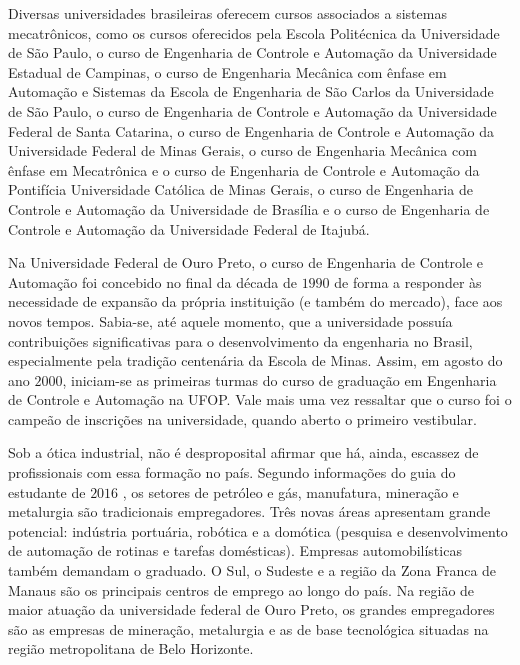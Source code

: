 Diversas universidades brasileiras oferecem cursos associados a sistemas mecatr{\^o}nicos, como os cursos oferecidos pela Escola Polit{\'e}cnica da Universidade de S{\~a}o Paulo, o curso de Engenharia de Controle e Automa{\c c}{\~a}o da Universidade Estadual de Campinas, o curso de Engenharia Mec{\^a}nica com {\^e}nfase em Automa{\c c}{\~a}o e Sistemas da Escola de Engenharia de S{\~a}o Carlos da Universidade de S{\~a}o Paulo, o curso de Engenharia de Controle e Automa{\c c}{\~a}o da Universidade Federal de Santa Catarina, o curso de Engenharia de Controle e Automa{\c c}{\~a}o da Universidade Federal de Minas Gerais, o curso de Engenharia Mec{\^a}nica com {\^e}nfase em Mecatr{\^o}nica e o curso de Engenharia de Controle e Automa{\c c}{\~a}o da Pontif{\'i}cia Universidade Católica de Minas Gerais, o curso de Engenharia de Controle e Automa{\c c}{\~a}o da Universidade de Bras{\'i}lia e o curso de Engenharia de Controle e Automa{\c c}{\~a}o da Universidade Federal de Itajub{\'a}.

Na Universidade Federal de Ouro Preto, o curso de Engenharia de Controle e Automa{\c c}{\~a}o foi concebido no final da d{\'e}cada de $1990$ de forma a responder às necessidade de expans{\~a}o da pr{\'o}pria institui{\c c}{\~a}o (e tamb{\'e}m do mercado), face aos novos tempos. Sabia-se, at{\'e} aquele momento, que a universidade possu{\'i}a contribui{\c c}{\~o}es significativas para o desenvolvimento da engenharia no Brasil, especialmente pela tradi{\c c}{\~a}o centen{\'a}ria da Escola de Minas. Assim, em agosto do ano $2000$, iniciam-se as primeiras turmas do curso de gradua{\c c}{\~a}o em Engenharia de Controle e Automa{\c c}{\~a}o na UFOP. Vale mais uma vez ressaltar que o curso foi o campeão de inscrições na universidade, quando aberto o primeiro vestibular.

Sob a ótica industrial, não é desproposital afirmar que há, ainda, escassez de profissionais com essa formação no país. Segundo informações do guia do estudante de $2016$ \cite{guia-do-estudante}, os setores de petróleo e gás, manufatura, mineração e metalurgia são tradicionais empregadores. Três novas áreas apresentam grande potencial: indústria portuária, robótica e a domótica (pesquisa e desenvolvimento de automação de rotinas e tarefas domésticas). Empresas automobilísticas também demandam o graduado. O Sul, o Sudeste e a região da Zona Franca de Manaus são os principais centros de emprego ao longo do país. Na região de maior atuação da universidade federal de Ouro Preto, os grandes empregadores são as empresas de mineração, metalurgia e as de base tecnológica situadas na região metropolitana de Belo Horizonte. 

